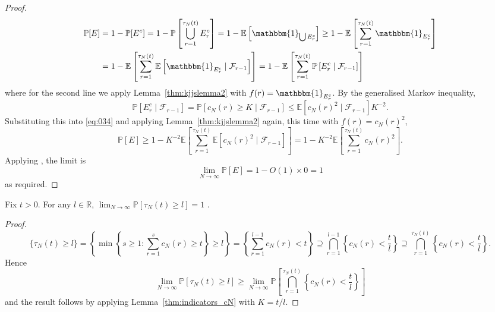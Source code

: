 \documentclass{article}
\newcommand{\Prob}{\mathbb{P}}
\newcommand{\E}{\mathbb{E}}
\newcommand{\1}[1]{\mathbbm{1}_{#1}}
\begin{document}
\begin{proof}
\begin{align}
\Prob[E]
&= 1- \Prob[E^c]
= 1- \Prob\left[ \bigcup_{r=1}^{\tau_N(t)} E_r^c \right]
= 1- \E\left[ \1{\bigcup E_r^c} \right]
\geq 1 - \E\left[ \sum_{r=1}^{\tau_N(t)} \1{E_r^c} \right] \notag\\
&= 1- \E\left[  \sum_{r=1}^{\tau_N(t)} \E\left[ \1{E_r^c} 
        \mid \mathcal{F}_{r-1} \right] \right]
= 1- \E\left[  \sum_{r=1}^{\tau_N(t)} \Prob\left[ E_r^c
        \mid \mathcal{F}_{r-1} \right] \right] \label{eq:034}
\end{align}
where for the second line we apply Lemma~\ref{thm:kjjslemma2} with $f(r) = \1{E_r^c} $.
By the generalised Markov inequality,
\begin{equation}
\Prob[ E_r^c \mid \mathcal{F}_{r-1} ]
= \Prob[ c_N(r) \geq K \mid \mathcal{F}_{r-1} ]
\leq \E[c_N(r)^2 \mid \mathcal{F}_{r-1} ] K^{-2} .
\end{equation}
Substituting this into \eqref{eq:034} and applying Lemma~\ref{thm:kjjslemma2} again, this time with $f(r) = c_N(r)^2$,
\begin{equation}
\Prob[E]
\geq 1- K^{-2} \E\left[  \sum_{r=1}^{\tau_N(t)} 
        \E[c_N(r)^2 \mid \mathcal{F}_{r-1} ] \right]
= 1 - K^{-2} \E\left[  \sum_{r=1}^{\tau_N(t)} c_N(r)^2 \right] .
\end{equation}
Applying \citet[Equation (3.5)]{brown2021}, the limit is
\begin{equation}
\lim_{N\to\infty} \Prob[E]
= 1 - O(1) \times 0
=1 
\end{equation}
as required.
\end{proof}


\begin{lemma}\label{thm:indicators_tau}
Fix $t>0$. For any $l \in \mathbb{R}$,
$\lim_{N\to\infty} \Prob[ \tau_N(t) \geq l ] =1$ .
\end{lemma}

\begin{proof}
\begin{equation}
\{ \tau_N(t) \geq l \} 
= \left\{ \min \left\{ s \geq 1 : \sum_{r=1}^{s} c_N(r) \geq t \right\} \geq l \right\}
= \left\{ \sum_{r=1}^{l-1} c_N(r) < t \right\}
\supseteq \bigcap_{r=1}^{l-1} \left \{ c_N(r) < \frac{t}{l} \right\}
\supseteq \bigcap_{r=1}^{\tau_N(t)} \left \{ c_N(r) < \frac{t}{l} \right\} .
\end{equation}
Hence
\begin{equation}
\lim_{N\to\infty} \Prob[ \tau_N(t) \geq l ] 
\geq \lim_{N\to\infty} \Prob\left[ \bigcap_{r=1}^{\tau_N(t)} 
        \left \{ c_N(r) < \frac{t}{l} \right\} \right]
\end{equation}
and the result follows by applying Lemma~\ref{thm:indicators_cN} with $K=t/l$.
\end{proof}
\end{document}
